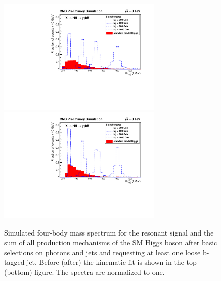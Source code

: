 \begin{figure}[ht]
 \begin{center}
   \includegraphics[width=0.70\textwidth]{figures/selection/TotalMass_OnlyHiggs.pdf}
   \includegraphics[width=0.70\textwidth]{figures/selection/TotalMassKinFit_OnlyHiggs.pdf}
 \end{center}
\caption{Simulated four-body mass spectrum for the resonant signal and the sum of all production
mechanisms of the
SM Higgs boson after basic selections on photons and jets and requesting at least
one loose b-tagged jet. Before (after) the kinematic fit is shown in the top (bottom) figure.
The spectra are normalized to one.}
\label{fig:mggjj_onlyhiggs}
\end{figure}

